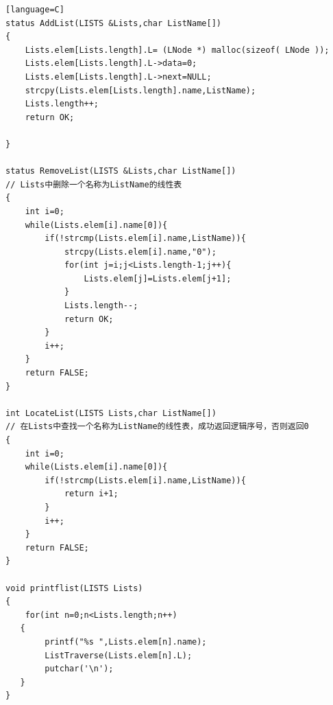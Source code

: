 \documentclass[supercite]{Experimental_Report}
\theoremstyle{definition}
\begin{document}
\begin{sloppypar}
\begin{lstlisting}[breaklines][language=C]
status AddList(LISTS &Lists,char ListName[])
{
    Lists.elem[Lists.length].L= (LNode *) malloc(sizeof( LNode ));
    Lists.elem[Lists.length].L->data=0;
    Lists.elem[Lists.length].L->next=NULL;
    strcpy(Lists.elem[Lists.length].name,ListName);
    Lists.length++;
	return OK;
	
}

status RemoveList(LISTS &Lists,char ListName[])
// Lists中删除一个名称为ListName的线性表
{
    int i=0;
    while(Lists.elem[i].name[0]){
        if(!strcmp(Lists.elem[i].name,ListName)){
        	strcpy(Lists.elem[i].name,"0");
            for(int j=i;j<Lists.length-1;j++){
                Lists.elem[j]=Lists.elem[j+1];
            }
            Lists.length--;
            return OK;
        }
        i++;
    }
    return FALSE;
}

int LocateList(LISTS Lists,char ListName[])
// 在Lists中查找一个名称为ListName的线性表，成功返回逻辑序号，否则返回0
{
    int i=0;
    while(Lists.elem[i].name[0]){
        if(!strcmp(Lists.elem[i].name,ListName)){
            return i+1;
        }
        i++;
    }
    return FALSE;
}

void printflist(LISTS Lists)
{
	for(int n=0;n<Lists.length;n++)
   {
   		printf("%s ",Lists.elem[n].name);
   		ListTraverse(Lists.elem[n].L);
        putchar('\n');
   }
}


\end{lstlisting}
\end{sloppypar}
\end{document}
